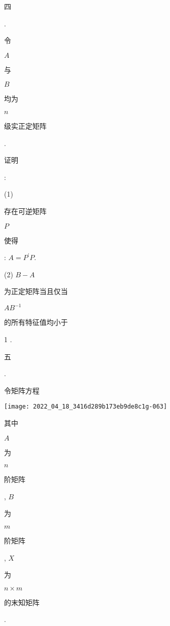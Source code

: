 \documentclass[10pt]{article}
\begin{document}
\begin{CJK}{UTF8}{mj}四\end{CJK}. \begin{CJK}{UTF8}{mj}令\end{CJK} $A$ \begin{CJK}{UTF8}{mj}与\end{CJK} $B$ \begin{CJK}{UTF8}{mj}均为\end{CJK} $n$ \begin{CJK}{UTF8}{mj}级实正定矩阵\end{CJK}. \begin{CJK}{UTF8}{mj}证明\end{CJK}:

(1) \begin{CJK}{UTF8}{mj}存在可逆矩阵\end{CJK} $P$ \begin{CJK}{UTF8}{mj}使得\end{CJK}: $A=P^{\prime} P$.

(2) $B-A$ \begin{CJK}{UTF8}{mj}为正定矩阵当且仅当\end{CJK} $A B^{-1}$ \begin{CJK}{UTF8}{mj}的所有特征值均小于\end{CJK} 1 .

\begin{CJK}{UTF8}{mj}五\end{CJK}. \begin{CJK}{UTF8}{mj}令矩阵方程\end{CJK}

\texttt{[image: 2022\_04\_18\_3416d289b173eb9de8c1g-063]}

\begin{CJK}{UTF8}{mj}其中\end{CJK} $A$ \begin{CJK}{UTF8}{mj}为\end{CJK} $n$ \begin{CJK}{UTF8}{mj}阶矩阵\end{CJK}, $B$ \begin{CJK}{UTF8}{mj}为\end{CJK} $m$ \begin{CJK}{UTF8}{mj}阶矩阵\end{CJK}, $X$ \begin{CJK}{UTF8}{mj}为\end{CJK} $n \times m$ \begin{CJK}{UTF8}{mj}的末知矩阵\end{CJK}.
\end{document}
